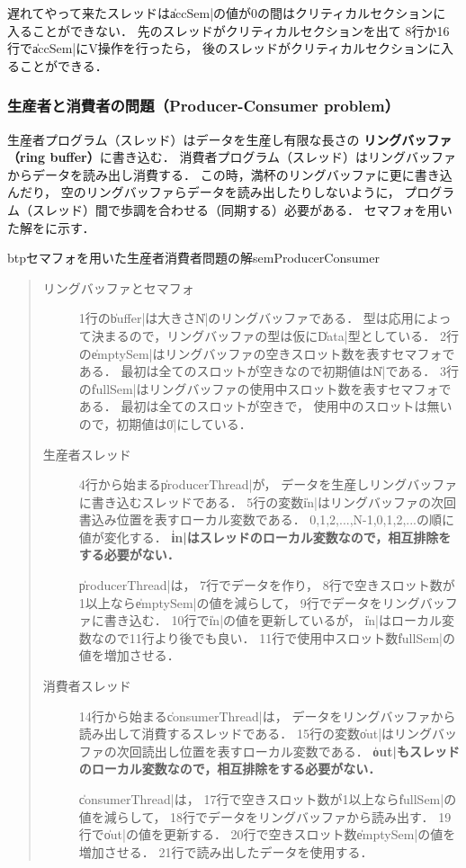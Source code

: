 遅れてやって来たスレッドは\|accSem|の値が0の間はクリティカルセクションに
入ることができない．
先のスレッドがクリティカルセクションを出て
8行か16行で\|accSem|にV操作を行ったら，
後のスレッドがクリティカルセクションに入ることができる．

\subsubsection{生産者と消費者の問題（Producer-Consumer problem）}
生産者プログラム（スレッド）はデータを生産し有限な長さの
{\bf リングバッファ（ring buffer）}に書き込む．
消費者プログラム（スレッド）はリングバッファからデータを読み出し消費する．
この時，満杯のリングバッファに更に書き込んだり，
空のリングバッファらデータを読み出したりしないように，
プログラム（スレッド）間で歩調を合わせる（同期する）必要がある．
セマフォを用いた解をに示す．

\begin{myfig}{btp}{セマフォを用いた生産者消費者問題の解}{semProducerConsumer}

\end{myfig}

\begin{quote}
\begin{description}
\item [リングバッファとセマフォ]
1行の\|buffer|は大きさ\|N|のリングバッファである．
型は応用によって決まるので，リングバッファの型は仮に\|Data|型としている．
2行の\|emptySem|はリングバッファの空きスロット数を表すセマフォである．
最初は全てのスロットが空きなので初期値は\|N|である．
3行の\|fullSem|はリングバッファの使用中スロット数を表すセマフォである．
最初は全てのスロットが空きで，
使用中のスロットは無いので，初期値は\|0|にしている．

\item [生産者スレッド]
4行から始まる\|producerThread|が，
データを生産しリングバッファに書き込むスレッドである．
5行の変数\|in|はリングバッファの次回書込み位置を表すローカル変数である．
0,1,2,...,N-1,0,1,2,...の順に値が変化する．
{\bf \|in|はスレッドのローカル変数なので，相互排除をする必要がない．}

\|producerThread|は，
7行でデータを作り，
8行で空きスロット数が1以上なら\|emptySem|の値を減らして，
9行でデータをリングバッファに書き込む．
10行で\|in|の値を更新しているが，
\|in|はローカル変数なので11行より後でも良い．
11行で使用中スロット数\|fullSem|の値を増加させる．

\item [消費者スレッド]
14行から始まる\|consumerThread|は，
データをリングバッファから読み出して消費するスレッドである．
15行の変数\|out|はリングバッファの次回読出し位置を表すローカル変数である．
{\bf \|out|もスレッドのローカル変数なので，相互排除をする必要がない．}

\|consumerThread|は，
17行で空きスロット数が1以上なら\|fullSem|の値を減らして，
18行でデータをリングバッファから読み出す．
19行で\|out|の値を更新する．
20行で空きスロット数\|emptySem|の値を増加させる．
21行で読み出したデータを使用する．
\end{description}
\end{quote}

